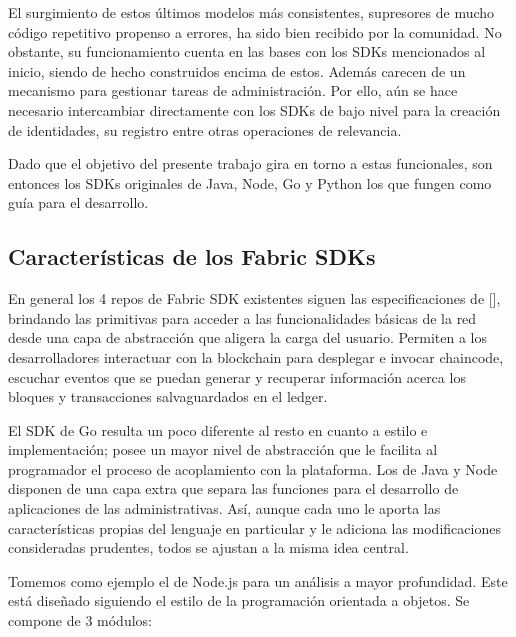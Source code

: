 El surgimiento de estos \'ultimos modelos m\'as consistentes, supresores de mucho c\'odigo repetitivo propenso a errores, ha sido bien recibido por la comunidad. No obstante, su funcionamiento cuenta en las bases con los SDKs mencionados al inicio, siendo de hecho construidos encima de estos. Adem\'as carecen de un mecanismo para gestionar tareas de administraci\'on. Por ello, a\'un se hace necesario intercambiar directamente con los SDKs de bajo nivel para la creaci\'on de identidades, su registro entre otras operaciones de relevancia.

Dado que el objetivo del presente trabajo gira en torno a estas funcionales, son entonces los SDKs originales de Java, Node, Go y Python los que fungen como gu\'ia para el desarrollo.

\subsection{Caracter\'isticas de los Fabric SDKs}

En general los 4 repos de Fabric SDK existentes siguen las especificaciones de [\cite{fabricsdkspec}], brindando las primitivas para acceder a las funcionalidades b\'asicas de la red desde una capa de abstracci\'on que aligera la carga del usuario. Permiten a los desarrolladores interactuar con la blockchain para desplegar e invocar chaincode, escuchar eventos que se puedan generar y recuperar informaci\'on acerca los bloques y transacciones salvaguardados en el ledger. 

El SDK de Go resulta un poco diferente al resto en cuanto a estilo e implementaci\'on; posee un mayor nivel de abstracci\'on que le facilita al programador el proceso de acoplamiento con la plataforma. Los de Java y Node disponen de una capa extra que separa las funciones para el desarrollo de aplicaciones de las administrativas. As\'i, aunque cada uno le aporta las caracter\'isticas propias del lenguaje en particular y le adiciona las modificaciones consideradas prudentes, todos se ajustan a la misma idea central.


Tomemos como ejemplo el de Node.js para un an\'alisis a mayor profundidad. Este est\'a dise\~nado siguiendo el estilo de la programaci\'on orientada a objetos. Se compone de 3 m\'odulos:

